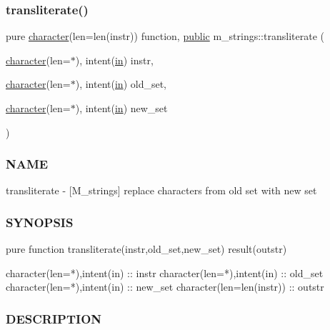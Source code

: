 \subsubsection{\texorpdfstring{transliterate()}{transliterate()}}
{\footnotesize\ttfamily pure \hyperlink{option__stopwatch_83_8txt_abd4b21fbbd175834027b5224bfe97e66}{character}(len=len(instr)) function, \hyperlink{M__stopwatch_83_8txt_a2f74811300c361e53b430611a7d1769f}{public} m\+\_\+strings\+::transliterate (\begin{DoxyParamCaption}\item[{\hyperlink{option__stopwatch_83_8txt_abd4b21fbbd175834027b5224bfe97e66}{character}(len=$\ast$), intent(\hyperlink{M__journal_83_8txt_afce72651d1eed785a2132bee863b2f38}{in})}]{instr,  }\item[{\hyperlink{option__stopwatch_83_8txt_abd4b21fbbd175834027b5224bfe97e66}{character}(len=$\ast$), intent(\hyperlink{M__journal_83_8txt_afce72651d1eed785a2132bee863b2f38}{in})}]{old\+\_\+set,  }\item[{\hyperlink{option__stopwatch_83_8txt_abd4b21fbbd175834027b5224bfe97e66}{character}(len=$\ast$), intent(\hyperlink{M__journal_83_8txt_afce72651d1eed785a2132bee863b2f38}{in})}]{new\+\_\+set }\end{DoxyParamCaption})}



\subsubsection*{N\+A\+ME}

transliterate -\/ \mbox{[}M\+\_\+strings\mbox{]} replace characters from old set with new set 

\subsubsection*{S\+Y\+N\+O\+P\+S\+IS}

\begin{DoxyVerb}pure function transliterate(instr,old_set,new_set) result(outstr)

 character(len=*),intent(in)  :: instr
 character(len=*),intent(in)  :: old_set
 character(len=*),intent(in)  :: new_set
 character(len=len(instr))    :: outstr
\end{DoxyVerb}


\subsubsection*{D\+E\+S\+C\+R\+I\+P\+T\+I\+ON}

